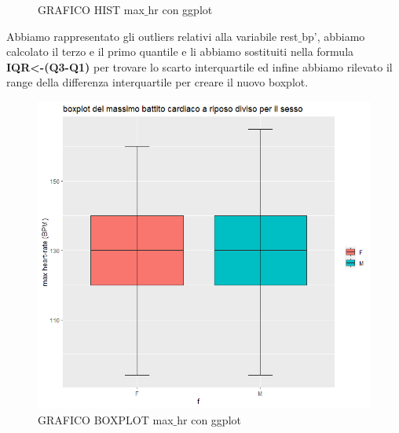 \documentclass{article}
\begin{document}
\begin{figure}[!htb]
\begin{minipage}{0.475\textwidth}
     \caption{GRAFICO HIST max$\_$hr con ggplot}
     \label{Fig:ds1}
   \end{minipage}
\end{figure}
Abbiamo rappresentato gli outliers relativi alla variabile rest$\_$bp’, abbiamo calcolato il terzo e il primo quantile e li abbiamo sostituiti nella formula\\ \textbf{IQR\textless-(Q3-Q1)} per trovare lo scarto interquartile ed infine abbiamo rilevato il range della differenza interquartile per creare il nuovo boxplot. 


\begin{figure}[!htb]
   \begin{minipage}{0.475\textwidth}
     \centering
     \includegraphics[width=1\linewidth]{rest_bp-boxpot after}
     \caption{GRAFICO BOXPLOT max$\_$hr con ggplot}
     \label{Fig:ds1}
   \end{minipage}\hfill
   \begin{minipage}{0.475\textwidth}
     \centering

\end{minipage}
\end{figure}
\end{document}

